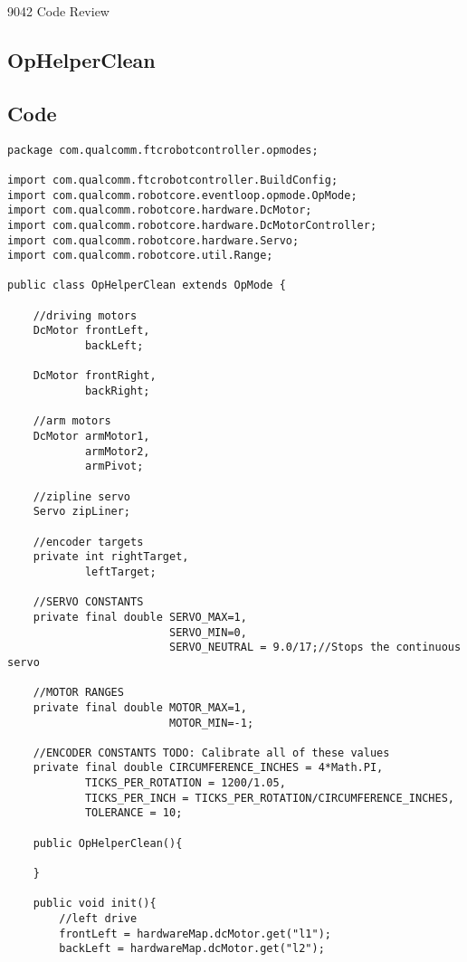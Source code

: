 \documentclass[11pt,fleqn]{article}
\begin{document}
\begin{center}
{\huge
9042 Code Review
}
\end{center}

\begin{center}
\section*{OpHelperClean}
\end{center}

\subsection*{Code}

\begin{verbatim}
package com.qualcomm.ftcrobotcontroller.opmodes;

import com.qualcomm.ftcrobotcontroller.BuildConfig;
import com.qualcomm.robotcore.eventloop.opmode.OpMode;
import com.qualcomm.robotcore.hardware.DcMotor;
import com.qualcomm.robotcore.hardware.DcMotorController;
import com.qualcomm.robotcore.hardware.Servo;
import com.qualcomm.robotcore.util.Range;

public class OpHelperClean extends OpMode {

    //driving motors
    DcMotor frontLeft,
            backLeft;

    DcMotor frontRight,
            backRight;

    //arm motors
    DcMotor armMotor1,
            armMotor2,
            armPivot;

    //zipline servo
    Servo zipLiner;

    //encoder targets
    private int rightTarget,
            leftTarget;

    //SERVO CONSTANTS
    private final double SERVO_MAX=1,
                         SERVO_MIN=0,
                         SERVO_NEUTRAL = 9.0/17;//Stops the continuous servo

    //MOTOR RANGES
    private final double MOTOR_MAX=1,
                         MOTOR_MIN=-1;

    //ENCODER CONSTANTS TODO: Calibrate all of these values
    private final double CIRCUMFERENCE_INCHES = 4*Math.PI,
            TICKS_PER_ROTATION = 1200/1.05,
            TICKS_PER_INCH = TICKS_PER_ROTATION/CIRCUMFERENCE_INCHES,
            TOLERANCE = 10;

    public OpHelperClean(){

    }

    public void init(){
        //left drive
        frontLeft = hardwareMap.dcMotor.get("l1");
        backLeft = hardwareMap.dcMotor.get("l2");


\end{verbatim}
\end{document}
